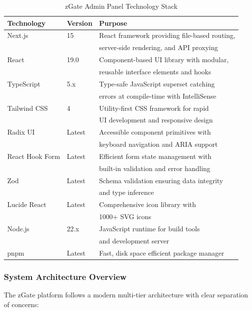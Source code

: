 \begin{table}[H]
\centering
\caption{zGate Admin Panel Technology Stack}
\small
\begin{tabular}{|l|l|l|}
\hline

\textbf{Technology} & \textbf{Version} & \textbf{Purpose} \\
\hline
Next.js & 15 & React framework providing file-based routing, \\
 & & server-side rendering, and API proxying \\
\hline
React & 19.0 & Component-based UI library with modular, \\
 & & reusable interface elements and hooks \\
\hline
TypeScript & 5.x & Type-safe JavaScript superset catching \\
 & & errors at compile-time with IntelliSense \\
\hline
Tailwind CSS & 4 & Utility-first CSS framework for rapid \\
 & & UI development and responsive design \\
\hline
Radix UI & Latest & Accessible component primitives with \\
 & & keyboard navigation and ARIA support \\
\hline
React Hook Form & Latest & Efficient form state management with \\
 & & built-in validation and error handling \\
\hline
Zod & Latest & Schema validation ensuring data integrity \\
 & & and type inference \\
\hline
Lucide React & Latest & Comprehensive icon library with \\
 & & 1000+ SVG icons \\
\hline
Node.js & 22.x & JavaScript runtime for build tools \\
 & & and development server \\
\hline
pnpm & Latest & Fast, disk space efficient package manager \\
\hline
\end{tabular}
\end{table}

\subsubsection{System Architecture Overview}

The zGate platform follows a modern multi-tier architecture with clear separation of concerns:

